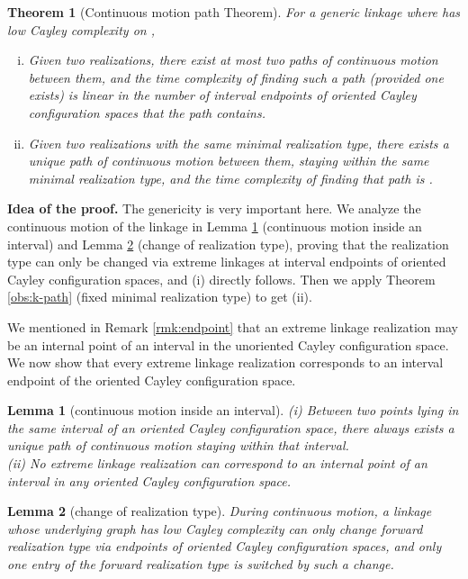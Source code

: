 \documentclass[secthm,amsthm,english]{article}
\newtheorem{theorem}{Theorem}
\newtheorem{lemma}{Lemma}
\theoremstyle{definition}
\theoremstyle{remark}
\begin{document}
\begin{theorem}[Continuous motion path Theorem] \label{theo:path}
For a generic linkage  where  has low Cayley complexity on , 
\begin{enumerate}[(i)]
	\item Given two realizations, 
	there exist \emph{at most two} paths of continuous motion between them, 
	and the time complexity of finding such a path (provided one exists) is linear in the number of  
	interval endpoints of oriented Cayley configuration spaces that the path contains. 
	
	\item Given two realizations with the same minimal realization type, 
	there exists a unique path of continuous motion between them, 
	staying within the same minimal realization type, 
	and the time complexity of finding that path is . 
\end{enumerate}
\end{theorem}

\noindent \textbf{Idea of the proof. } 
The genericity is very important here. 
We analyze the continuous motion of the linkage in Lemma \ref{lem:endpoint} (continuous motion inside an interval) 
and Lemma \ref{lem:reachable} (change of realization type),
proving that the realization type can only be changed via extreme linkages at interval endpoints of oriented Cayley configuration spaces,
and (i) directly follows. 
Then we apply Theorem \ref{obs:k-path} (fixed minimal realization type) to get (ii). 



We mentioned in Remark \ref{rmk:endpoint} that
an extreme linkage realization may be an internal point 
of an interval in the unoriented Cayley configuration space. 
We now show that every extreme linkage realization corresponds to an interval endpoint 
of the oriented Cayley configuration space. 

\begin{lemma}[continuous motion inside an interval] \label{lem:endpoint}
(i) Between two points lying in the same interval of an oriented Cayley configuration space, 
there always exists a unique path of continuous motion staying within that interval. \\
(ii) No extreme linkage realization can correspond to an internal point of an interval in any oriented Cayley configuration space. 
\end{lemma}



\begin{lemma}[change of realization type] \label{lem:reachable}
During continuous motion, 
a linkage whose underlying graph has low Cayley complexity can only change forward realization type via endpoints of oriented Cayley configuration spaces, 
and only one entry of the forward realization type is switched by such a change. 
\end{lemma}
\end{document}
